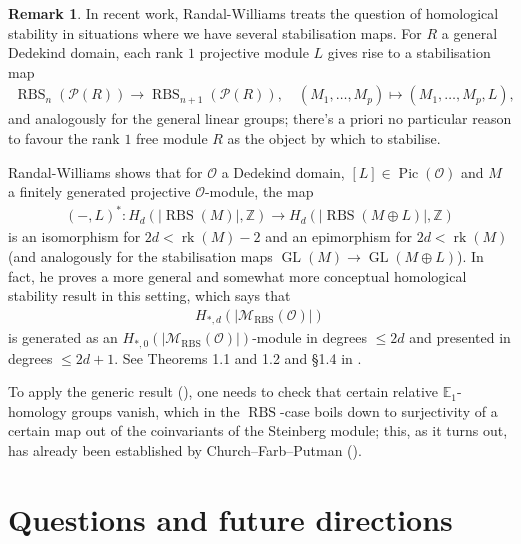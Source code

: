 \documentclass[12pt, reqno]{amsart}
\theoremstyle{plain}
\theoremstyle{definition}
\newtheorem{remark}[theorem]{Remark}
\newcommand{\Z}{\mathbb Z}
\begin{document}
\begin{remark}\label{general Dedekind}
In recent work, Randal-Williams treats the question of homological stability in situations where we have several stabilisation maps. For $R$ a general Dedekind domain, each rank $1$ projective module $L$ gives rise to a stabilisation map
\begin{align*}
\operatorname{RBS}_n(\mathcal{P}(R))\rightarrow \operatorname{RBS}_{n+1}(\mathcal{P}(R)),\quad (M_1,\ldots,M_p)\mapsto (M_1,\ldots,M_p,L),
\end{align*}
and analogously for the general linear groups; there's a priori no particular reason to favour the rank $1$ free module $R$ as the object by which to stabilise.

Randal-Williams shows that for $\mathcal{O}$ a Dedekind domain, $[L]\in \operatorname{Pic}(\mathcal{O})$ and $M$ a finitely generated projective $\mathcal{O}$-module, the map
\begin{align*}
(-,L)^*\colon H_d(|\operatorname{RBS}(M)|,\Z)\rightarrow H_d(|\operatorname{RBS}(M\oplus L)|,\Z)
\end{align*}
is an isomorphism for $2d<\operatorname{rk}(M)-2$ and an epimorphism for $2d<\operatorname{rk}(M)$ (and analogously for the stabilisation maps $\operatorname{GL}(M)\rightarrow \operatorname{GL}(M\oplus L)$). In fact, he proves a more general and somewhat more conceptual homological stability result in this setting, which says that
\begin{align*}
H_{\ast,d}(|\mathscr{M}_{\operatorname{RBS}}(\mathcal{O})|)
\end{align*}
is generated as an $H_{\ast,0}(|\mathscr{M}_{\operatorname{RBS}}(\mathcal{O})|)$-module in degrees $\leq 2d$ and presented in degrees $\leq 2d+1$. See Theorems 1.1 and 1.2 and \S 1.4 in \cite{RandalWilliams24}.

To apply the generic result (\cite[Theorem 1.5]{RandalWilliams24}), one needs to check that certain relative $\mathbb{E}_1$-homology groups vanish, which in the $\operatorname{RBS}$-case boils down to surjectivity of a certain map out of the coinvariants of the Steinberg module; this, as it turns out, has already been established by Church--Farb--Putman (\cite[\S 5.2]{ChurchFarbPutman}).
\end{remark}


\section{Questions and future directions}\label{questions}
\end{document}
